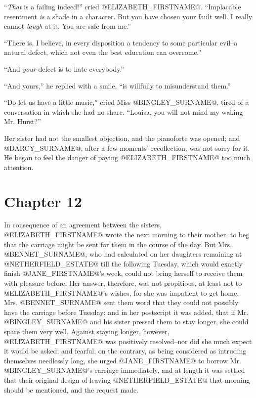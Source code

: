 ``\textit{That} is a failing indeed!'' cried @ELIZABETH_FIRSTNAME@. ``Implacable resentment
\textit{is} a shade in a character. But you have chosen your fault well. I
really cannot \textit{laugh} at it. You are safe from me.''

``There is, I believe, in every disposition a tendency to some particular
evil--a natural defect, which not even the best education can overcome.''

``And \textit{your} defect is to hate everybody.''

``And yours,'' he replied with a smile, ``is willfully to misunderstand
them.''

``Do let us have a little music,'' cried Miss @BINGLEY_SURNAME@, tired of a
conversation in which she had no share. ``Louisa, you will not mind my
waking Mr. Hurst?''

Her sister had not the smallest objection, and the pianoforte was
opened; and @DARCY_SURNAME@, after a few moments' recollection, was not sorry for
it. He began to feel the danger of paying @ELIZABETH_FIRSTNAME@ too much attention.



\chapter*{Chapter 12}


In consequence of an agreement between the sisters, @ELIZABETH_FIRSTNAME@ wrote the
next morning to their mother, to beg that the carriage might be sent for
them in the course of the day. But Mrs. @BENNET_SURNAME@, who had calculated on
her daughters remaining at @NETHERFIELD_ESTATE@ till the following Tuesday, which
would exactly finish @JANE_FIRSTNAME@'s week, could not bring herself to receive
them with pleasure before. Her answer, therefore, was not propitious, at
least not to @ELIZABETH_FIRSTNAME@'s wishes, for she was impatient to get home. Mrs.
@BENNET_SURNAME@ sent them word that they could not possibly have the carriage
before Tuesday; and in her postscript it was added, that if Mr. @BINGLEY_SURNAME@
and his sister pressed them to stay longer, she could spare them
very well. Against staying longer, however, @ELIZABETH_FIRSTNAME@ was positively
resolved--nor did she much expect it would be asked; and fearful, on the
contrary, as being considered as intruding themselves needlessly long,
she urged @JANE_FIRSTNAME@ to borrow Mr. @BINGLEY_SURNAME@'s carriage immediately, and at
length it was settled that their original design of leaving @NETHERFIELD_ESTATE@
that morning should be mentioned, and the request made.


